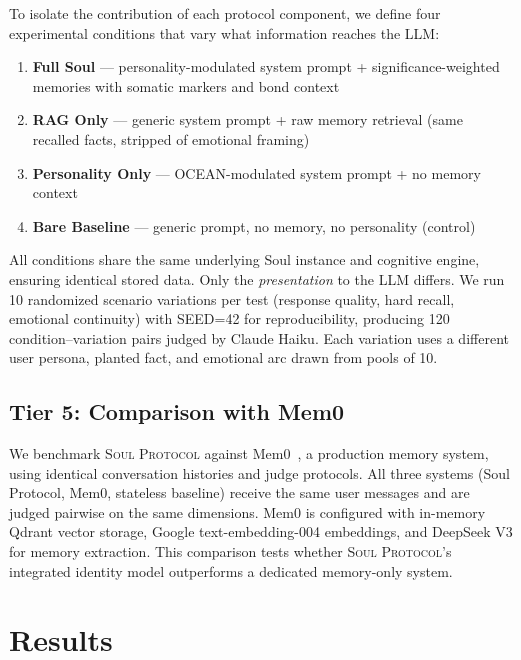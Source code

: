 \documentclass{article}
\newcommand{\soul}{\textsc{Soul Protocol}}
\begin{document}
To isolate the contribution of each protocol component, we define four experimental conditions that vary what information reaches the LLM:

\begin{enumerate}[leftmargin=*, topsep=2pt, itemsep=1pt]
  \item \textbf{Full Soul} --- personality-modulated system prompt + significance-weighted memories with somatic markers and bond context
  \item \textbf{RAG Only} --- generic system prompt + raw memory retrieval (same recalled facts, stripped of emotional framing)
  \item \textbf{Personality Only} --- OCEAN-modulated system prompt + no memory context
  \item \textbf{Bare Baseline} --- generic prompt, no memory, no personality (control)
\end{enumerate}

All conditions share the same underlying Soul instance and cognitive engine, ensuring identical stored data. Only the \textit{presentation} to the LLM differs. We run 10 randomized scenario variations per test (response quality, hard recall, emotional continuity) with SEED=42 for reproducibility, producing 120 condition--variation pairs judged by Claude Haiku. Each variation uses a different user persona, planted fact, and emotional arc drawn from pools of 10.

\subsection{Tier 5: Comparison with Mem0}

We benchmark \soul{} against Mem0~\cite{chhablani2025mem0}, a production memory system, using identical conversation histories and judge protocols. All three systems (Soul Protocol, Mem0, stateless baseline) receive the same user messages and are judged pairwise on the same dimensions. Mem0 is configured with in-memory Qdrant vector storage, Google text-embedding-004 embeddings, and DeepSeek V3 for memory extraction. This comparison tests whether \soul{}'s integrated identity model outperforms a dedicated memory-only system.


\section{Results}
\label{sec:results}
\end{document}
